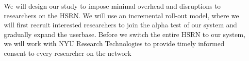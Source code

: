 We will design our study to impose minimal overhead and disruptions to researchers on the HSRN. We will use an incremental roll-out model, where we will first recruit interested researchers to join the alpha test of our system and gradually expand the userbase. Before we switch the entire HSRN to our system, we will work with NYU Research Technologies to provide timely informed consent to every researcher on the network



